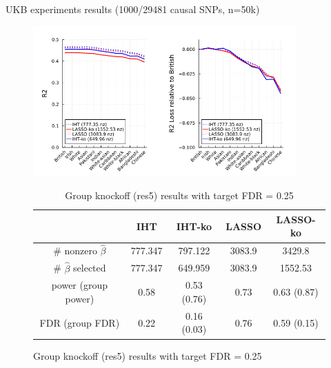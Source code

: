 \documentclass[aspectratio=169, 10pt]{beamer}
\begin{document}
\begin{frame}{UKB experiments results (1000/29481 causal SNPs, n=50k)}
    \begin{minipage}[b]{0.65\linewidth}
        \begin{figure}
            \centering
            \includegraphics[width=0.9\textwidth]{figures/k1000_n50000.png}
            \begin{table}[]
                \centering
                \small
                \begin{tabular}{c|c|c|c|c}
                & IHT & IHT-ko & LASSO & LASSO-ko\\
                \hline
                 \# nonzero $\hat{\beta}$ & 777.347 & 797.122 & 3083.9 & 3429.8\\
                 \# $\hat{\beta}$ selected & 777.347 & 649.959 & 3083.9 & 1552.53\\
                 power (group power) & 0.58 & 0.53 (0.76) & 0.73 & 0.63 (0.87)\\
                 FDR (group FDR) & 0.22 & 0.16 (0.03) & 0.76 & 0.59 (0.15)\\
                 \hline
            \end{tabular}
            \caption{Group knockoff (res5) results with target FDR = 0.25}
    \end{table}
    \end{figure}
    
    \end{minipage}
    \hspace{0.5cm}
    \begin{minipage}[b]{0.25\linewidth}
        \vspace{3cm}
    \end{minipage}
\end{frame}
\end{document}
